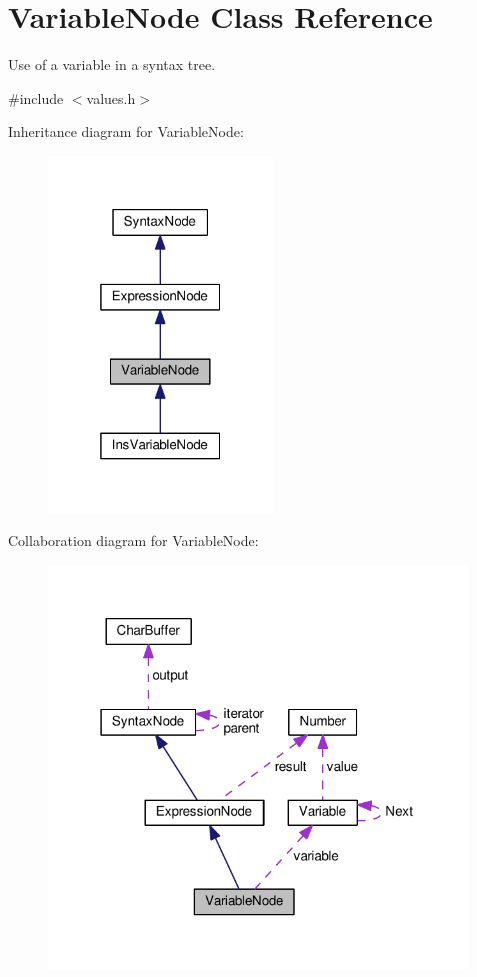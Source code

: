 \hypertarget{classVariableNode}{}\section{Variable\+Node Class Reference}
\label{classVariableNode}


Use of a variable in a syntax tree.  




{\ttfamily \#include $<$values.\+h$>$}



Inheritance diagram for Variable\+Node\+:
\nopagebreak
\begin{figure}[H]
\begin{center}
\leavevmode
\includegraphics[width=169pt]{d2/df9/classVariableNode__inherit__graph}
\end{center}
\end{figure}


Collaboration diagram for Variable\+Node\+:
\nopagebreak
\begin{figure}[H]
\begin{center}
\leavevmode
\includegraphics[width=316pt]{db/d09/classVariableNode__coll__graph}
\end{center}
\end{figure}
